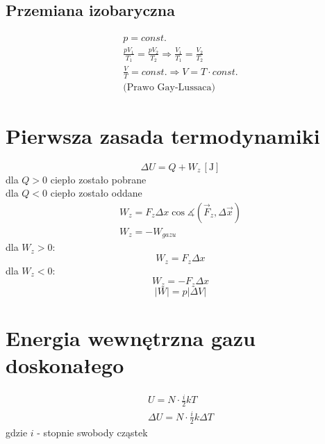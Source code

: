 \documentclass{report}
\numberwithin{equation}{chapter}
\newcommand{\unit}[1]{\,\left[\mathrm{#1}\right]}
\begin{document}
      \subsection{Przemiana izobaryczna}
        \begin{gather}
          p = const.\\
          \frac{pV_1}{T_1} = \frac{pV_2}{T_2} \Rightarrow \frac{V_1}{T_1} = \frac{V_2}{T_2}\\
          \frac{V}{T} = const. \Rightarrow V = T\cdot const.\\
          \text{(Prawo Gay-Lussaca)}
        \end{gather}
    \section{Pierwsza zasada termodynamiki}
      \begin{equation}
        \Delta U = Q + W_z \unit{J}
      \end{equation}
      dla $Q > 0$ ciepło zostało pobrane\\
      dla $Q < 0$ ciepło zostało oddane
      \begin{gather}
        W_z = F_z\Delta x\cos\measuredangle(\vec F_z, \Delta\vec x)\\
        W_z = -W_{gazu}
      \end{gather}
      dla $W_z > 0$:
      \begin{equation}
        W_z = F_z\Delta x
      \end{equation}
      dla $W_z < 0$:
      \begin{equation}
        W_z = -F_z\Delta x
      \end{equation}
      \begin{equation}
        |W| = p|\Delta V|
      \end{equation}
    \section{Energia wewnętrzna gazu doskonałego}
      \begin{gather}
        U = N\cdot\frac{i}{2}kT\\
        \Delta U = N\cdot\frac{i}{2}k\Delta T
      \end{gather}
      gdzie $i$ - stopnie swobody cząstek
\end{document}
